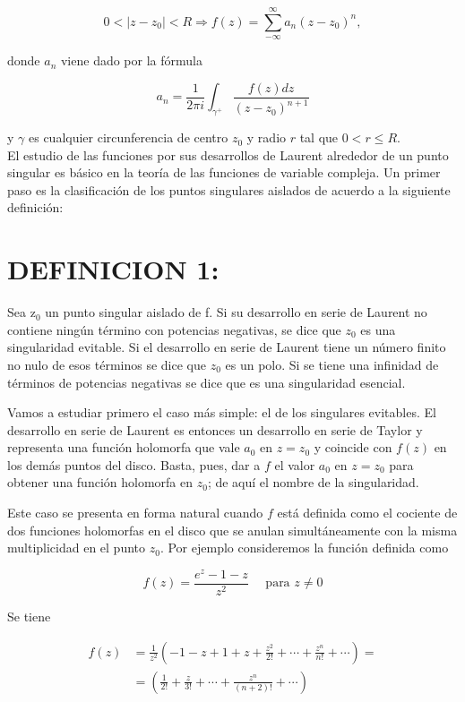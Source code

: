\documentclass[10pt]{article}
\theoremstyle{plain}
\theoremstyle{definition}
\theoremstyle{remark}
\begin{document}
\begin{equation*}
0<\left|z-z_{0}\right|<R \Rightarrow f(z)=\sum_{-\infty}^{\infty} a_{n}\left(z-z_{0}\right)^{n}, \tag{17-1}
\end{equation*}


donde $a_{n}$ viene dado por la fórmula


\begin{equation*}
a_{n}=\frac{1}{2 \pi i} \int_{\gamma^{+}} \frac{f(z) d z}{\left(z-z_{0}\right)^{n+1}} \tag{17-2}
\end{equation*}


y $\gamma$ es cualquier circunferencia de centro $z_{0}$ y radio $r$ tal que $0<r \leqslant R$.\\
El estudio de las funciones por sus desarrollos de Laurent alrededor de un punto singular es básico en la teoría de las funciones de variable compleja. Un primer paso es la clasificación de los puntos singulares aislados de acuerdo a la siguiente definición:

\section*{DEFINICION 1:}
Sea $\mathrm{z}_{0}$ un punto singular aislado de f. Si su desarrollo en serie de Laurent no contiene ningún término con potencias negativas, se dice que $z_{0}$ es una singularidad evitable. Si el desarrollo en serie de Laurent tiene un número finito no nulo de esos términos se dice que $z_{0}$ es un polo. Si se tiene una infinidad de términos de potencias negativas se dice que es una singularidad esencial.

Vamos a estudiar primero el caso más simple: el de los singulares evitables. El desarrollo en serie de Laurent es entonces un desarrollo en serie de Taylor y representa una función holomorfa que vale $a_{0}$ en $z=z_{0}$ y coincide con $f(z)$ en los demás puntos del disco. Basta, pues, dar a $f$ el valor $a_{0}$ en $z=z_{0}$ para obtener una función holomorfa en $z_{0}$; de aquí el nombre de la singularidad.

Este caso se presenta en forma natural cuando $f$ está definida como el cociente de dos funciones holomorfas en el disco que se anulan simultáneamente con la misma multiplicidad en el punto $z_{0}$. Por ejemplo consideremos la función definida como

$$
f(z)=\frac{e^{z}-1-z}{z^{2}} \quad \text { para } z \neq 0
$$

Se tiene

$$
\begin{aligned}
f(z) & =\frac{1}{z^{2}}\left(-1-z+1+z+\frac{z^{2}}{2!}+\cdots+\frac{z^{n}}{n!}+\cdots\right)= \\
& =\left(\frac{1}{2!}+\frac{z}{3!}+\cdots+\frac{z^{n}}{(n+2)!}+\cdots\right)
\end{aligned}
$$
\end{document}
